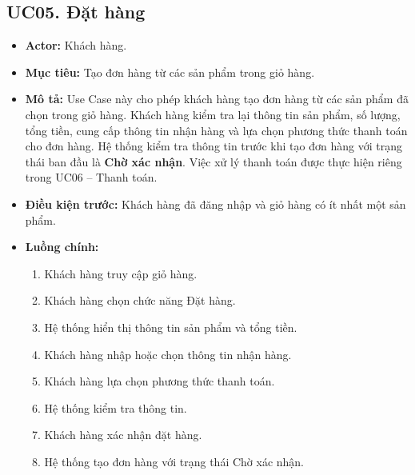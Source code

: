 \documentclass[12pt,a4paper]{article}
\begin{document}

\subsection*{UC05. Đặt hàng}

\begin{itemize}

 \item \textbf{Actor:} Khách hàng.

 \item \textbf{Mục tiêu:} Tạo đơn hàng từ các sản phẩm trong giỏ hàng.

 \item \textbf{Mô tả:} Use Case này cho phép khách hàng tạo đơn hàng từ các sản phẩm đã chọn trong giỏ hàng. Khách hàng kiểm tra lại thông tin sản phẩm, số lượng, tổng tiền, cung cấp thông tin nhận hàng và lựa chọn phương thức thanh toán cho đơn hàng. Hệ thống kiểm tra thông tin trước khi tạo đơn hàng với trạng thái ban đầu là \textbf{Chờ xác nhận}. Việc xử lý thanh toán được thực hiện riêng trong UC06 -- Thanh toán.

 \item \textbf{Điều kiện trước:} Khách hàng đã đăng nhập và giỏ hàng có ít nhất một sản phẩm.

 \item \textbf{Luồng chính:}

 \begin{enumerate}

  \item Khách hàng truy cập giỏ hàng.

  \item Khách hàng chọn chức năng Đặt hàng.

  \item Hệ thống hiển thị thông tin sản phẩm và tổng tiền.

  \item Khách hàng nhập hoặc chọn thông tin nhận hàng.

  \item Khách hàng lựa chọn phương thức thanh toán.

  \item Hệ thống kiểm tra thông tin.

  \item Khách hàng xác nhận đặt hàng.

  \item Hệ thống tạo đơn hàng với trạng thái Chờ xác nhận.


\end{enumerate}
\end{itemize}
\end{document}
